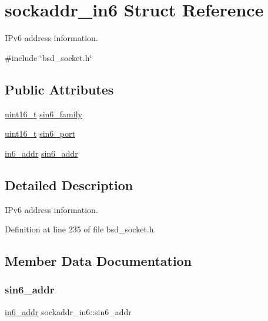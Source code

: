 \hypertarget{structsockaddr__in6}{}\section{sockaddr\+\_\+in6 Struct Reference}
\label{structsockaddr__in6}


I\+Pv6 address information.  




{\ttfamily \#include \char`\"{}bsd\+\_\+socket.\+h\char`\"{}}

\subsection*{Public Attributes}
\begin{DoxyCompactItemize}
\item 
\hyperlink{stdint_8h_a273cf69d639a59973b6019625df33e30}{uint16\+\_\+t} \hyperlink{structsockaddr__in6_ac529d8e83c6d57c56d1cb7ddf61b0e8b}{sin6\+\_\+family}
\item 
\hyperlink{stdint_8h_a273cf69d639a59973b6019625df33e30}{uint16\+\_\+t} \hyperlink{structsockaddr__in6_a4fc2b7a478d258e9e778772701096022}{sin6\+\_\+port}
\item 
\hyperlink{structin6__addr}{in6\+\_\+addr} \hyperlink{structsockaddr__in6_a1ac1ff5bdfe91ac993cec3a80eddcccb}{sin6\+\_\+addr}
\end{DoxyCompactItemize}


\subsection{Detailed Description}
I\+Pv6 address information. 

Definition at line 235 of file bsd\+\_\+socket.\+h.



\subsection{Member Data Documentation}
\mbox{\label{structsockaddr__in6_a1ac1ff5bdfe91ac993cec3a80eddcccb}} 
\subsubsection{\texorpdfstring{sin6\+\_\+addr}{sin6\_addr}}
{\footnotesize\ttfamily \hyperlink{structin6__addr}{in6\+\_\+addr} sockaddr\+\_\+in6\+::sin6\+\_\+addr}



